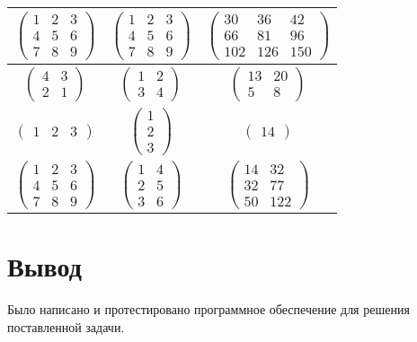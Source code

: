 \begin{table}[ht!]
\begin{center}
\begin{tabular}{|c|c|c|}
				\\ \hline
				$\begin{pmatrix}
					1 & 2 & 3\\
					4 & 5 & 6\\
					7 & 8 & 9
				\end{pmatrix}$ &
				$\begin{pmatrix}
					1 & 2 & 3\\
					4 & 5 & 6\\
					7 & 8 & 9
				\end{pmatrix}$ &
				$\begin{pmatrix}
					30 & 36 & 42\\
					66 & 81 & 96\\
					102 & 126 & 150
				\end{pmatrix}$ 
				
				\\ \hline
				$\begin{pmatrix}
					4 & 3 \\
					2 & 1 
				\end{pmatrix}$ &
				$\begin{pmatrix}
					1 & 2\\
					3 & 4
				\end{pmatrix}$ &
				$\begin{pmatrix}
					13 & 20 \\
					5 & 8 
				\end{pmatrix}$                  
				
				\\ \hline
				$\begin{pmatrix}
					1 & 2 & 3
				\end{pmatrix}$ &
				$\begin{pmatrix}
					1\\
					2\\
					3
				\end{pmatrix}$ &
				$\begin{pmatrix}
					14
				\end{pmatrix}$ 
				
				\\ \hline
				$\begin{pmatrix}
					1 & 2 & 3 \\
					4 & 5 & 6 \\
					7 & 8 & 9
				\end{pmatrix}$ &
				$\begin{pmatrix}
					1 & 4\\
					2 & 5\\
					3 & 6
				\end{pmatrix}$ &
				$\begin{pmatrix}
					14 & 32 \\
					32 & 77 \\
					50 & 122
				\end{pmatrix}$                  
				\\ \hline
			\end{tabular}
	\end{center}
\end{table}

\newpage
\section*{Вывод}
Было написано и протестировано программное обеспечение для решения поставленной задачи.